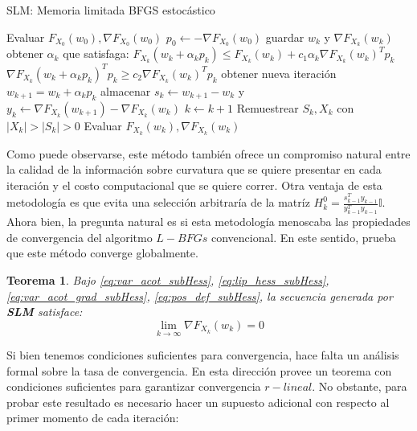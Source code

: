 \documentclass{book}
\theoremstyle{plain}
\newtheorem{thm}{Teorema}[section]
\theoremstyle{definition}
\theoremstyle{remark}
\begin{document}
\begin{algorithm}[H]
   \caption{SLM: Memoria limitada BFGS estocástico}
    \begin{algorithmic}[4]
      \State Evaluar $F_{X_0}(w_0), \nabla F_{X_0}(w_0)$
      \State $p_0\gets -\nabla F_{X_0}(w_0)$
            \State guardar $w_k$ y $ \nabla F_{X_k}(w_k)$
            \State obtener $\alpha_k$ que satisfaga:
            \State $F_{X_k}(w_k + \alpha_kp_k)\leq F_{X_k}(w_k) + c_1\alpha_k\nabla F_{X_k}(w_k)^Tp_k$
            \State $\nabla F_{X_k}(w_k + \alpha_kp_k)^Tp_k\geq c_2\nabla F_{X_k}(w_k)^Tp_k$
            \State obtener nueva iteración $w_{k+1} = w_k + \alpha_k p_k$
            \State almacenar $s_k\gets w_{k+1} - w_k$ y $y_k\gets\nabla F_{X_k}(w_{k+1})-\nabla F_{X_k}(w_k) $
            \State $k \gets k+1$
            \State Remuestrear $S_k, X_k$ con $|X_k|>|S_k|>0$
            \State Evaluar $F_{X_k}(w_k),\nabla F_{X_k}(w_k)$
        \EndWhile
       \EndFunction
\end{algorithmic}
\end{algorithm}

Como puede observarse, este método también ofrece un compromiso natural entre la calidad de la información sobre curvatura que se quiere presentar en cada iteración y el costo computacional que se quiere correr. Otra ventaja de esta metodología es que evita una selección arbitraría de la matríz $H_k^0=\frac{s_{k-1}^Ty_{k-1}}{y^T_{k-1}y_{k-1}}\mathbb{I}$\cite{NOCEDAL}. Ahora bien, la pregunta natural es si esta metodología menoscaba las propiedades de convergencia del algoritmo $L-BFGs$ convencional. En este sentido, \cite{BYRD} prueba que este método converge globalmente.

\begin{thm}
Bajo \ref{eq:var_acot_subHess}, \ref{eq:lip_hess_subHess}, \ref{eq:var_acot_grad_subHess}, \ref{eq:pos_def_subHess}, la secuencia generada por \textbf{SLM} satisface:
\begin{equation}
    \displaystyle\lim_{k\rightarrow\infty}\nabla F_{X_k}(w_k) = 0
\end{equation}
\end{thm}

 Si bien tenemos condiciones suficientes para convergencia, hace falta un análisis formal sobre la tasa de convergencia. En esta dirección \cite{BYRD2} provee un teorema con condiciones suficientes para garantizar convergencia $r-lineal$. No obstante, para probar este resultado es necesario hacer un supuesto adicional con respecto al primer momento de cada iteración:
\end{document}
